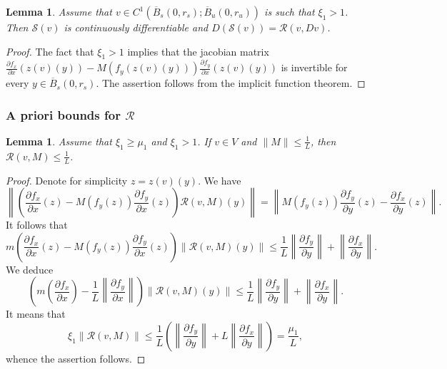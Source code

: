 \documentclass[11pt, leqno]{amsart}
\newtheorem{lem}[thm]{Lemma}
\theoremstyle{definition}
\begin{document}
\begin{lem}
 Assume that $v\in C^1(\overline{B}_s(0,r_s);\overline{B}_u(0,r_u))$  is such that $\xi_1 > 1$. Then $\mathcal{S}(v)$ is continuously differentiable and $D(\mathcal{S}(v)) = \mathcal{R}(v,Dv)$.
\end{lem}
\begin{proof} The fact that $\xi_1>1$ implies that the jacobian matrix $\frac{\partial f_x}{\partial x}(z(v)(y)) -  M(f_y(z(v)(y))) \frac{\partial f_y}{\partial x}(z(v)(y))$ is invertible for every $y\in \overline{B}_s(0,r_s)$. The assertion follows from the implicit function theorem.
	\end{proof}

\subsubsection{A priori bounds for $\mathcal{R}$}

\begin{lem}
\label{lem:S2-Mbnd}
Assume that $\xi_1 \geq \mu_1$ and $\xi_1>1$. If $v \in V$ and $\|M\| \leq \frac{1}{L}$, then $\mathcal{R}(v,M) \leq \frac{1}{L}$.
\end{lem}
\begin{proof} Denote for simplicity $z = z(v)(y)$. We have
	$$
		\left\|\left(\frac{\partial f_x}{\partial x}(z) -  M(f_y(z)) \frac{\partial f_y}{\partial x}(z) \right) \mathcal{R}(v,M)(y) \right\|=
		\left\| M(f_y(z))\frac{\partial f_y}{\partial y}(z) -   \frac{\partial f_x}{\partial y}(z)\right\|.
		$$
It follows that
	$$
m\left(\frac{\partial f_x}{\partial x}(z) -  M(f_y(z)) \frac{\partial f_y}{\partial x}(z) \right) \left\|\mathcal{R}(v,M)(y) \right\|\leq
\frac{1}{L}\left\| \frac{\partial f_y}{\partial y}\right\| +   \left\|\frac{\partial f_x}{\partial y}\right\|.
$$
We deduce
	$$
\left(m\left(\frac{\partial f_x}{\partial x}\right) -  \frac{1}{L} \left\|\frac{\partial f_y}{\partial x} \right\|\right) \left\|\mathcal{R}(v,M)(y) \right\|\leq
\frac{1}{L}\left\| \frac{\partial f_y}{\partial y}\right\| +   \left\|\frac{\partial f_x}{\partial y}\right\|.
$$
It means that
$$
\xi_1 \|\mathcal{R}(v,M)\| \leq  \frac{1}{L} \left(  \left\|\frac{\partial f_y}{\partial y}\right\| + L \left\|\frac{\partial f_x}{\partial y}\right\| \right)=\frac{\mu_1}{L},
$$
whence the assertion follows.
\end{proof}
\end{document}

